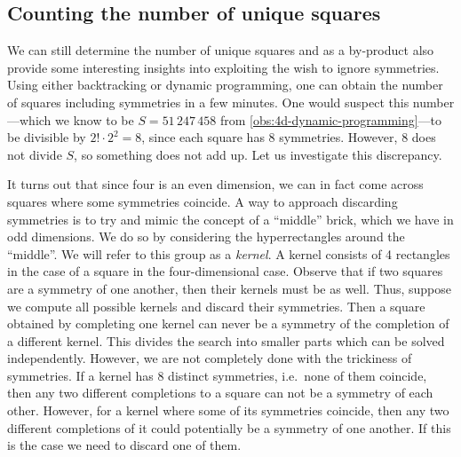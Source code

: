 
\subsection{Counting the number of unique squares}
We can still determine the number of unique squares and as a by-product also provide some interesting insights into exploiting the wish to ignore symmetries. Using either backtracking or dynamic programming, one can obtain the number of squares including symmetries in a few minutes. One would suspect this number---which we know to be $S = 51\,247\,458$ from \cref{obs:4d-dynamic-programming}---to be divisible by $2!\cdot 2^2 = 8$, since each square has $8$ symmetries. However, $8$ does not divide $S$, so something does not add up. Let us investigate this discrepancy.

It turns out that since four is an even dimension, we can in fact come across squares where some symmetries coincide. A way to approach discarding symmetries is to try and mimic the concept of a ``middle'' brick, which we have in odd dimensions. We do so by considering the hyperrectangles around the ``middle''. We will refer to this group as a \textit{kernel}. A kernel consists of 4 rectangles in the case of a square in the four-dimensional case. Observe that if two squares are a symmetry of one another, then their kernels must be as well. Thus, suppose we compute all possible kernels and discard their symmetries. Then a square obtained by completing one kernel can never be a symmetry of the completion of a different kernel. This divides the search into smaller parts which can be solved independently. However, we are not completely done with the trickiness of symmetries. If a kernel has 8 distinct symmetries, i.e.\ none of them coincide, then any two different completions to a square can not be a symmetry of each other. However, for a kernel where some of its symmetries coincide, then any two different completions of it could potentially be a symmetry of one another. If this is the case we need to discard one of them.

